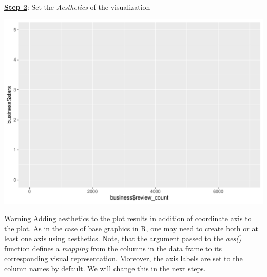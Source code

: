\documentclass[12pt]{book}\usepackage{knitr}
\begin{document}
\newpage
\noindent \textbf{\Large \underline{Step 2}}: {\Large Set the \emph{Aesthetics} of the visualization} 
\begin{knitrout}
\color{fgcolor}\begin{kframe}
\begin{alltt}
 \hlkwb{<-}  \hlopt{+}
\hlstd{(}  \hlopt{$}
      \hlopt{$}
\hlstd{)}
\end{alltt}
\end{kframe}
\includegraphics[width=\maxwidth]{figure/add_aesthetics-1} 

\end{knitrout}

\begin{DIY}{Warning}
\noindent Adding aesthetics to the plot results in addition of coordinate axis to the plot. As in the case of base graphics in R, one may need to create both or at least one axis using aesthetics. Note, that the argument passed to the \emph{aes()} function defines a \emph{mapping} from the columns in the data frame to its corresponding visual representation. Moreover, the axis labels are set to the column names by default. We will change this in the next steps.
\end{DIY}
\end{document}
